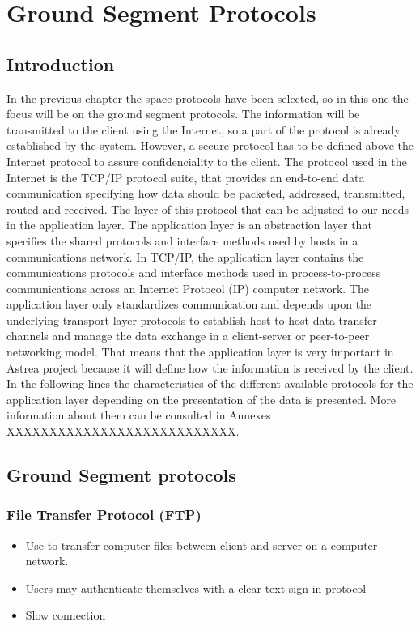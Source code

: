 \chapter{Ground Segment Protocols}

\section{Introduction}
In the previous chapter the space protocols have been selected, so in this one the focus will be on the ground segment protocols. The information will be transmitted to the client using the Internet, so a part of the protocol is already established by the system. However, a secure protocol has to be defined above the Internet protocol to assure confidenciality to the client. The protocol used in the Internet is the TCP/IP protocol suite, that provides an end-to-end data communication specifying how data should be packeted, addressed, transmitted, routed and received. The layer of this protocol that can be adjusted to our needs in the application layer. The application layer is an abstraction layer that specifies the shared protocols and interface methods used by hosts in a communications network. In TCP/IP, the application layer contains the communications protocols and interface methods used in process-to-process communications across an Internet Protocol (IP) computer network. The application layer only standardizes communication and depends upon the underlying transport layer protocols to establish host-to-host data transfer channels and manage the data exchange in a client-server or peer-to-peer networking model. That means that the application layer is very important in Astrea project because it will define how the information is received by the client.\\
In the following lines the characteristics of the different available protocols for the application layer depending on the presentation of the data is presented. More information about them can be consulted in Annexes XXXXXXXXXXXXXXXXXXXXXXXXXXX.
\section{Ground Segment protocols}

\subsection{File Transfer Protocol (FTP)}
\begin{itemize}
\item Use to transfer computer files between client and server on a computer network.
\item Users may authenticate themselves with a clear-text sign-in protocol
\item Slow connection 
\end{itemize}
